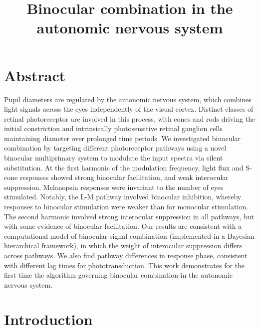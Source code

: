 \documentclass[
]{article}
\title{Binocular combination in the autonomic nervous system}
\author{}
\date{\vspace{-2.5em}}
\begin{document}
\maketitle

\hypertarget{abstract}{%
\section{Abstract}\label{abstract}}

Pupil diameters are regulated by the autonomic nervous system, which combines light signals across the eyes independently of the visual cortex. Distinct classes of retinal photoreceptor are involved in this process, with cones and rods driving the initial constriction and intrinsically photosensitive retinal ganglion cells maintaining diameter over prolonged time periods. We investigated binocular combination by targeting different photoreceptor pathways using a novel binocular multiprimary system to modulate the input spectra via silent substitution. At the first harmonic of the modulation frequency, light flux and S-cone responses showed strong binocular facilitation, and weak interocular suppression. Melanopsin responses were invariant to the number of eyes stimulated. Notably, the L-M pathway involved binocular inhibition, whereby responses to binocular stimulation were weaker than for monocular stimulation. The second harmonic involved strong interocular suppression in all pathways, but with some evidence of binocular facilitation. Our results are consistent with a computational model of binocular signal combination (implemented in a Bayesian hierarchical framework), in which the weight of interocular suppression differs across pathways. We also find pathway differences in response phase, consistent with different lag times for phototransduction. This work demonstrates for the first time the algorithm governing binocular combination in the autonomic nervous system.

\hypertarget{introduction}{%
\section{Introduction}\label{introduction}}
\end{document}

